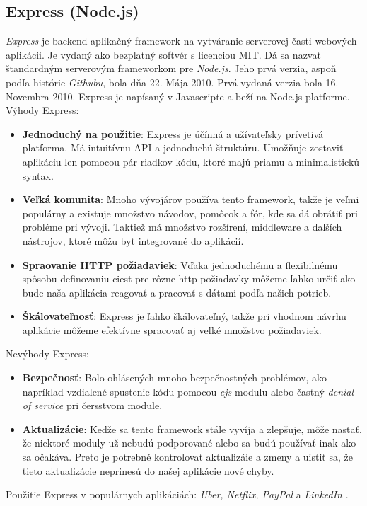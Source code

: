 \subsection{Express (Node.js)\label{section:express}}
\indent \indent \textit{Express} je backend aplikačný framework na vytváranie serverovej časti webových aplikácii. Je vydaný ako bezplatný softvér s licenciou MIT. Dá sa nazvať štandardným serverovým frameworkom pre \textit{Node.js}\cite{express}. Jeho prvá verzia, aspoň podľa histórie \textit{Githubu}, bola dňa 22. Mája 2010. Prvá vydaná verzia bola 16. Novembra 2010\cite{express_history}. Express je napísaný v Javascripte a beží na Node.js platforme. \\Výhody Express\cite{express_adv_dis}:
\begin{itemize}
    \item \textbf{Jednoduchý na použitie}: Express je účínná a užívateľsky prívetivá platforma. Má intuitívnu API a jednoduchú štruktúru. Umožňuje zostaviť aplikáciu len pomocou pár riadkov kódu, ktoré majú priamu a minimalistickú syntax. 
    \item \textbf{Veľká komunita}: Mnoho vývojárov používa tento framework, takže je veľmi populárny a existuje množstvo návodov, pomôcok a fór, kde sa dá obrátiť pri probléme pri vývoji. Taktiež má množstvo rozšírení, middleware a ďalších nástrojov, ktoré môžu byť integrované do aplikácií. 
    \item \textbf{Spraovanie HTTP požiadaviek}: Vďaka jednoduchému a flexibilnému spôsobu definovaniu ciest pre rôzne \acrshort{http} požiadavky môžeme ľahko určiť ako bude naša aplikácia reagovať a pracovať s dátami podľa našich potrieb.
    \item \textbf{Škálovateľnosť}: Express je ľahko škálovateľný, takže pri vhodnom návrhu aplikácie môžeme efektívne spracovať aj veľké množstvo požiadaviek. 
\end{itemize}
Nevýhody Express\cite{express_adv_dis}:
\begin{itemize}
    \item \textbf{Bezpečnosť}: Bolo ohlásených mnoho bezpečnostných problémov, ako napríklad vzdialené spustenie kódu pomocou \textit{ejs} modulu alebo častný \textit{denial of service} pri čersstvom module.
    \item \textbf{Aktualizácie}: Kedže sa tento framework stále vyvíja a zlepšuje, môže nastať, že niektoré moduly už nebudú podporované alebo sa budú používať inak ako sa očakáva. Preto je potrebné kontrolovať aktualizáie a zmeny a uistiť sa, že tieto aktualizácie neprinesú do našej aplikácie nové chyby.
\end{itemize}
Použitie Express v populárnych aplikáciách: \textit{Uber, Netflix, PayPal} a \textit{LinkedIn} \cite{express_adv_dis}.

